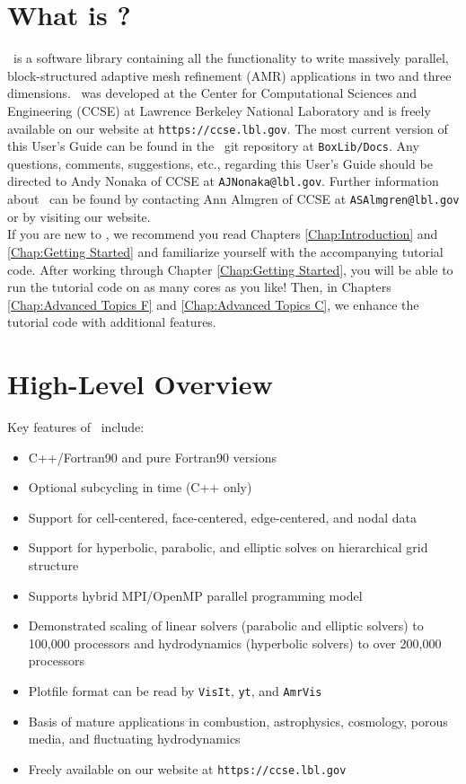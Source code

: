 \section{What is \BoxLib?}

\BoxLib\ is a software library containing all the functionality to write massively parallel, 
block-structured adaptive mesh refinement (AMR) applications in two and three dimensions.
\BoxLib\ was developed at the Center for Computational Sciences and Engineering (CCSE) at 
Lawrence Berkeley National Laboratory and is freely available on our website
at {\tt https://ccse.lbl.gov}.  The most current version of this User's Guide
can be found in the \BoxLib\ git repository at {\tt BoxLib/Docs}.  Any questions,
comments, suggestions, etc., regarding this User's Guide should be directed
to Andy Nonaka of CCSE at {\tt AJNonaka@lbl.gov}.  Further information 
about \BoxLib\ can be found by contacting Ann Almgren of CCSE at 
{\tt ASAlmgren@lbl.gov} or by visiting our website.\\

If you are new to \BoxLib, we recommend you read Chapters \ref{Chap:Introduction} and
\ref{Chap:Getting Started} and familiarize yourself with the accompanying tutorial code.
After working through Chapter \ref{Chap:Getting Started}, you will be able to run the tutorial
code on as many cores as you like!  Then, in Chapters \ref{Chap:Advanced Topics F} and \ref{Chap:Advanced Topics C}, we enhance 
the tutorial code with additional features.

\section{High-Level Overview}

Key features of \BoxLib\ include:
\begin{itemize}
\item C++/Fortran90 and pure Fortran90 versions
\item Optional subcycling in time (C++ only)
\item Support for cell-centered, face-centered, edge-centered, and nodal data
\item Support for hyperbolic, parabolic, and elliptic solves on hierarchical grid structure
\item Supports hybrid MPI/OpenMP parallel programming model
\item Demonstrated scaling of linear solvers (parabolic and elliptic solvers) to 100,000 processors and 
      hydrodynamics (hyperbolic solvers) to over 200,000 processors
\item Plotfile format can be read by {\tt VisIt}, {\tt yt}, and {\tt AmrVis}
\item Basis of mature applications in combustion, astrophysics, cosmology, porous media, and fluctuating hydrodynamics
\item Freely available on our website at {\tt https://ccse.lbl.gov}
\end{itemize}

